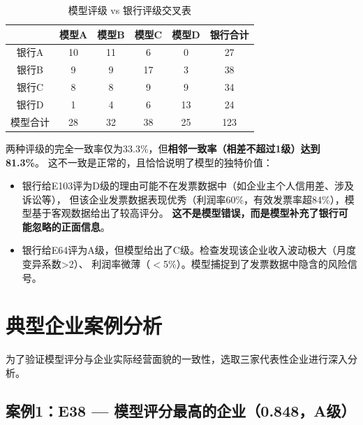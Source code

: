 \documentclass[12pt,a4paper]{ctexart}
\begin{document}
\begin{table}[H]
\centering
\caption{模型评级 vs 银行评级交叉表}
\label{tab:crosstab_detail}
\begin{tabular}{c|cccc|c}
\toprule
& \textbf{模型A} & \textbf{模型B} & \textbf{模型C} & \textbf{模型D} & \textbf{银行合计} \\
\midrule
银行A & 10 & 11 & 6  & 0  & 27 \\
银行B & 9  & 9  & 17 & 3  & 38 \\
银行C & 8  & 8  & 9  & 9  & 34 \\
银行D & 1  & 4  & 6  & 13 & 24 \\
\midrule
模型合计 & 28 & 32 & 38 & 25 & 123 \\
\bottomrule
\end{tabular}
\end{table}

两种评级的完全一致率仅为33.3\%，但\textbf{相邻一致率（相差不超过1级）达到81.3\%}。
这不一致是正常的，且恰恰说明了模型的独特价值：

\begin{itemize}
    \item 银行给E103评为D级的理由可能不在发票数据中（如企业主个人信用差、涉及诉讼等），
          但该企业发票数据表现优秀（利润率60\%，有效发票率超84\%），模型基于客观数据给出了较高评分。
          \textbf{这不是模型错误，而是模型补充了银行可能忽略的正面信息}。
    \item 银行给E64评为A级，但模型给出了C级。检查发现该企业收入波动极大（月度变异系数>2）、
          利润率微薄（$<$5\%）。模型捕捉到了发票数据中隐含的风险信号。
\end{itemize}

\section{典型企业案例分析}

为了验证模型评分与企业实际经营面貌的一致性，选取三家代表性企业进行深入分析。

\subsection{案例1：E38 — 模型评分最高的企业（0.848，A级）}
\end{document}
